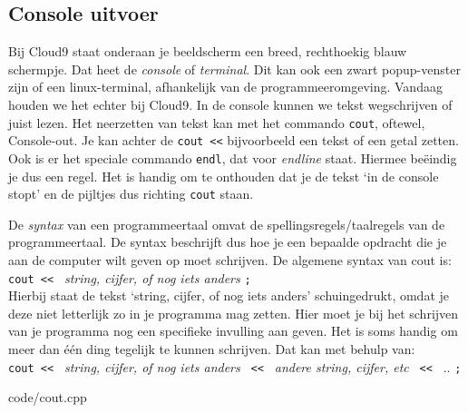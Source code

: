 \documentclass[12pt,a4paper]{article}
\newcommand{\code}{}
\newcommand{\icode}{\lstinline}
\begin{document}
\subsection{Console uitvoer}
Bij Cloud9 staat onderaan je beeldscherm een breed, rechthoekig blauw schermpje. Dat heet de \emph{console} of \emph{terminal}. Dit kan ook een zwart popup-venster zijn of een linux-terminal, afhankelijk van de programmeeromgeving. Vandaag houden we het echter bij Cloud9. In de console kunnen we tekst wegschrijven of juist lezen. Het neerzetten van tekst kan met het commando \icode{cout}, oftewel, Console-out. Je kan achter de \icode{cout <<} bijvoorbeeld een tekst of een getal zetten. Ook is er het speciale commando \icode{endl}, dat voor \emph{endline} staat. Hiermee be\"eindig je dus een regel. Het is handig om te onthouden dat je de tekst `in de console stopt' en de pijltjes dus richting \icode{cout} staan.

De \emph{syntax} van een programmeertaal omvat de spellingsregels/taalregels van de programmeertaal. De syntax beschrijft dus hoe je een bepaalde opdracht die je aan de computer wilt geven op moet schrijven. De algemene syntax van cout is:\\

\icode{cout << } \emph{string, cijfer, of nog iets anders} \icode{;}\\

Hierbij staat de tekst `string, cijfer, of nog iets anders' schuingedrukt, omdat je deze niet letterlijk zo in je programma mag zetten. Hier moet je bij het schrijven van je programma nog een specifieke invulling aan geven. Het is soms handig om meer dan \'e\'en ding tegelijk te kunnen schrijven. Dat kan met behulp van:\\

\icode{cout << } \emph{string, cijfer, of nog iets anders} \icode{ << } \emph{andere string, cijfer, etc} \icode{ << } .. \icode{;}

\code{code/cout.cpp}
\end{document}
